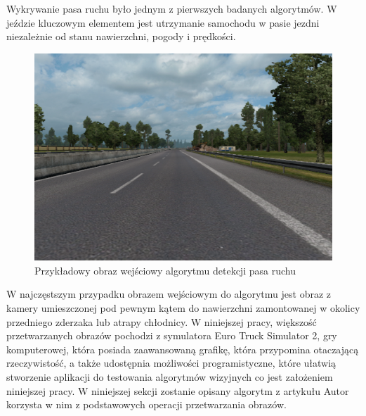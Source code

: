Wykrywanie pasa ruchu było jednym z pierwszych badanych algorytmów. W jeździe kluczowym elementem jest utrzymanie samochodu w pasie jezdni niezależnie od stanu nawierzchni, pogody i prędkości.

\begin{figure}
  \centering
  \includegraphics[width=12cm]{img/input.png}
  \caption{Przykładowy obraz wejściowy algorytmu detekcji pasa ruchu}
  \label{fig:inputimg}
\end{figure}

W najczęstszym przypadku obrazem wejściowym do algorytmu jest obraz z kamery umieszczonej pod pewnym kątem do nawierzchni zamontowanej w okolicy przedniego zderzaka lub atrapy chłodnicy. W niniejszej pracy, większość przetwarzanych obrazów pochodzi z symulatora Euro Truck Simulator 2, gry komputerowej, która posiada zaawansowaną grafikę, która przypomina otaczającą rzeczywistość, a także udostępnia możliwości programistyczne, które ułatwią stworzenie aplikacji do testowania algorytmów wizyjnych co jest założeniem niniejszej pracy. W niniejszej sekcji zostanie opisany algorytm z artykułu \cite{T3}
Autor korzysta w nim z podstawowych operacji przetwarzania obrazów. 



